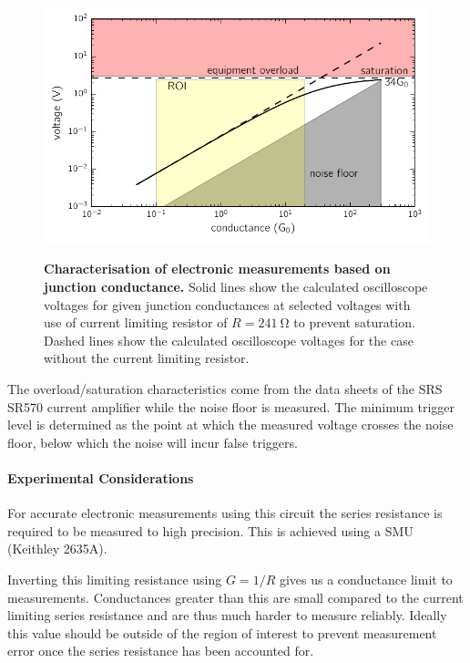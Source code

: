 \documentclass{article}
\begin{document}
\begin{figure}[h]
\centering
{\includegraphics{figures/hb_electronics_limits}} %
{\caption[Characterisation of electronic measurements based on junction conductance.]{\textbf{Characterisation of electronic measurements based on junction conductance.} Solid lines show the calculated oscilloscope voltages for given junction conductances at selected voltages with use of current limiting resistor of $R=\SI{241}{\ohm}$ to prevent saturation. Dashed lines show the calculated oscilloscope voltages for the case without the current limiting resistor.}
\label{fig:hb_electronics_limits}}
\end{figure}

The overload/saturation characteristics come from the data sheets of the SRS SR570 current amplifier while the noise floor is measured. The minimum trigger level is determined as the point at which the measured voltage crosses the noise floor, below which the noise will incur false triggers.

\paragraph{Experimental Considerations}

For accurate electronic measurements using this circuit the series resistance is required to be measured to high precision. This is achieved using a SMU (Keithley 2635A).

Inverting this limiting resistance using $G = 1/R$ gives us a conductance limit to measurements. Conductances greater than this are small compared to the current limiting series resistance and are thus much harder to measure reliably. Ideally this value should be outside of the region of interest to prevent measurement error once the series resistance has been accounted for.
\end{document}
